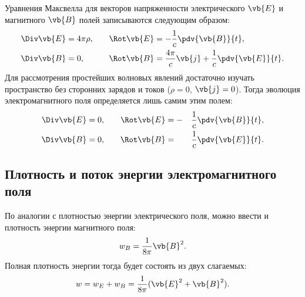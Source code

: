 \documentclass[\docroot/reports/lectures-draft/report.tex]{subfiles}
\begin{document}
    Уравнения Максвелла для векторов напряженности электрического $\vb{E}$ и магнитного $\vb{B}$ полей записываются следующим образом:
    \begin{alignat}{3}
        \Div \vb{E} &= 4 \pi \rho , &\quad \Rot \vb{E} &= - \frac{1}{c} \pdv{\vb{B}}{t} , \\
        \Div \vb{B} &= 0 , &\quad \Rot \vb{B} &= \frac{4 \pi}{c} \vb{j} + \frac{1}{c} \pdv{\vb{E}}{t} .
    \end{alignat}
    Для рассмотрения простейших волновых явлений достаточно изучать пространство без сторонних зарядов и токов ($\rho = 0$, $\vb{j} = 0$). Тогда эволюция электромагнитного поля определяется лишь самим этим полем:
    \begin{alignat}{4}\label{eq:maxwell-free-space}
        \Div \vb{E} &= 0 , &\quad \Rot \vb{E} &= - &{}\frac{1}{c} \pdv{\vb{B}}{t} , \\
        \Div \vb{B} &= 0 , &\quad \Rot \vb{B} &= &{}\frac{1}{c} \pdv{\vb{E}}{t} .
    \end{alignat}

\subsection{Плотность и поток энергии электромагнитного поля}

    По аналогии с плотностью энергии электрического поля, можно ввести и плотность энергии магнитного поля:
    \begin{equation*}
        w_B = \frac{1}{8 \pi} \vb{B}^2 .
    \end{equation*}
    Полная плотность энергии тогда будет состоять из двух слагаемых:
    \begin{equation*}
        w = w_E + w_B = \frac{1}{8 \pi} (\vb{E}^2 + \vb{B}^2) .
    \end{equation*}
\end{document}
